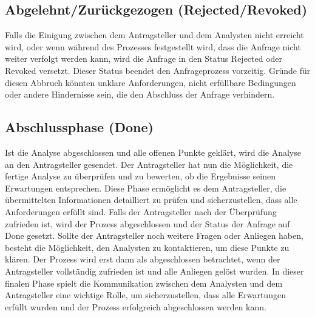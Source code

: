 \subsection*{Abgelehnt/Zur{\"u}ckgezogen (Rejected/Revoked)}
Falls die Einigung zwischen dem Antragsteller und dem Analysten nicht erreicht wird, oder wenn während des Prozesses festgestellt wird, dass die Anfrage nicht weiter verfolgt werden kann, wird die Anfrage in den Status \grqq Rejected\grqq{} oder \grqq Revoked\grqq{} versetzt. Dieser Status beendet den Anfrageprozess vorzeitig. Gründe für diesen Abbruch könnten unklare Anforderungen, nicht erfüllbare Bedingungen oder andere Hindernisse sein, die den Abschluss der Anfrage verhindern.
\subsection*{Abschlussphase (Done)}
Ist die Analyse abgeschlossen und alle offenen Punkte geklärt, wird die Analyse an den Antragsteller gesendet. Der Antragsteller hat nun die Möglichkeit, die fertige Analyse zu überprüfen und zu bewerten, ob die Ergebnisse seinen Erwartungen entsprechen. Diese Phase ermöglicht es dem Antragsteller, die übermittelten Informationen detailliert zu prüfen und sicherzustellen, dass alle Anforderungen erfüllt sind.
\newline
Falls der Antragsteller nach der Überprüfung zufrieden ist, wird der Prozess abgeschlossen und der Status der Anfrage auf \grqq Done\grqq{} gesetzt. Sollte der Antragsteller noch weitere Fragen oder Anliegen haben, besteht die Möglichkeit, den Analysten zu kontaktieren, um diese Punkte zu klären. Der Prozess wird erst dann als abgeschlossen betrachtet, wenn der Antragsteller vollständig zufrieden ist und alle Anliegen gelöst wurden.
\newline
In dieser finalen Phase spielt die Kommunikation zwischen dem Analysten und dem Antragsteller eine wichtige Rolle, um sicherzustellen, dass alle Erwartungen erfüllt wurden und der Prozess erfolgreich abgeschlossen werden kann.
